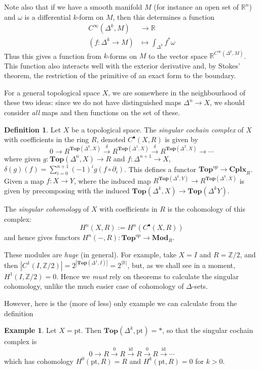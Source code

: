 \documentclass{tufte-handout}
\def\pt {\mathrm{pt}}
\def\Top {\mathbf{Top}}
\def\Mod {\mathbf{Mod}}
\def\Cplx{\mathbf{Cplx}}
\def\RR{\mathbb{R}}
\def\ZZ{\mathbb{Z}}
\DeclareMathOperator{\id}{id}
\theoremstyle{definition}
\newtheorem{definition}{Definition}
\newtheorem{example}{Example}
\begin{document}
Note also that if we have a smooth manifold $M$ (for instance an open set of $\RR^n$) and $\omega$ is
a differential $k$-form on $M$, then this determines a function
\begin{align*}
C^\infty(\Delta^k,M) &\to \RR\\
(f\colon \Delta^k\to M) & \mapsto \int_{\Delta^k} f^*\omega
\end{align*}
Thus this gives a function from $k$-forms on $M$ to the vector space $\RR^{C^\infty(\Delta^k,M)}$. 
This function also interacts well with the exterior derivative and, by Stokes' theorem, the restriction
of the primitive of an exact form to the boundary.

For a general topological space $X$, we are somewhere in the neighbourhood of these two ideas: since we do 
not have distinguished maps $\Delta^n \to X$, we should consider \emph{all} maps and then functions on
the set of these.

\begin{definition}
Let $X$ be a topological space. The \emph{singular cochain complex} of $X$ with coefficients in the 
ring $R$, denoted $C^\bullet(X,R)$  is given by
\[
	0 \to R^{\Top(\Delta^0,X)} \xrightarrow{\delta} R^{\Top(\Delta^1,X)} \xrightarrow{\delta} R^{\Top(\Delta^2,X)}\to \cdots
\]
where given $g\colon \Top(\Delta^n,X) \to R$ and $f\colon \Delta^{n+1} \to X$, $\delta(g)(f) = \sum_{i=0}^{n+1} (-1)^i g( f\circ \partial_i)$. This defines a functor $\Top^{op} \to \Cplx_R$.
Given a map $f\colon X\to Y$, where the induced map $R^{\Top(\Delta^k,Y)} \to R^{\Top(\Delta^k,X)}$ is given by precomposing with the induced $\Top(\Delta^k,X) \to \Top(\Delta^kY)$.

The \emph{singular cohomology} of $X$ with coefficients in $R$ is the cohomology of this complex:
\[
	H^n(X,R) := H^n(C^\bullet(X,R))
\]
and hence gives functors $H^n(-,R) \colon \Top^{op} \to \Mod_R$.
\end{definition}

These modules are \emph{huge} (in general). For example, take $X=I$ and $R=\ZZ/2$, and then 
$|C^1(I,\ZZ/2)| = 2^{|\Top(\Delta^1,I)|} = 2^{|\RR|}$, but, as we shall see in a moment, $H^1(I,\ZZ/2)=0$. 
Hence we \emph{must} rely on theorems to calculate the singular cohomology, unlike the much easier case
of cohomology of $\Delta$-sets.

However, here is the (more of less) only example we can calculate from the definition
\begin{example}
Let $X=\pt$. Then $\Top(\Delta^k,\pt) = \ast$, so that the singular cochain complex 
is
\[
0 \to R \xrightarrow{0} R \xrightarrow{\id} R \xrightarrow{0} R\xrightarrow{\id} \cdots
\]
which has cohomology $H^0(\pt,R) = R$ and $H^k(\pt,R) = 0$ for $k>0$.
\end{example}
\end{document}

